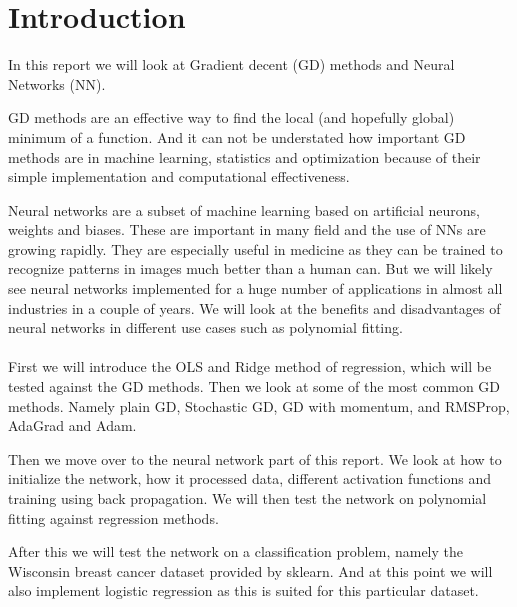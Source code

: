 \section{Introduction}


\begin{comment}
    In this report we will look at ...
    Motivate the reader, the first part of the introduction gives always a
    motivation and tries to give the overarching ideas. What I have done. 
    The structure of the report, how it is organised. Explain structure of the rapport at the end of intro. 
\end{comment}

In this report we will look at Gradient decent (GD) methods and Neural Networks
(NN).

GD methods are an effective way to find the local (and hopefully global)
minimum of a function. And it can not be understated how important GD methods
are in machine learning, statistics and optimization because of their simple
implementation and computational effectiveness.

Neural networks are a subset of machine learning based on artificial neurons,
weights and biases. These are important in many field and the use of NNs
are growing rapidly. They are especially useful in medicine as they can be
trained to recognize patterns in images much better than a human can. But we
will likely see neural networks implemented for a huge number of applications
in almost all industries in a couple of years. We will look at the benefits and
disadvantages of neural networks in different use cases such as polynomial
fitting.
\\~\\
First we will introduce the OLS and Ridge method of regression, which will be
tested against the GD methods. Then we look at some of the most common GD methods. Namely plain
GD, Stochastic GD, GD with momentum, and RMSProp, AdaGrad and Adam. 

Then we move over to the neural network part of this report. We look at how to
initialize the network, how it processed data, different activation functions and
training using back propagation. We will then test the network on polynomial
fitting against regression methods.

After this we will test the network on a classification problem, namely
the Wisconsin breast cancer dataset provided by sklearn. And at this point we
will also implement logistic regression as this is suited for this particular
dataset. 

